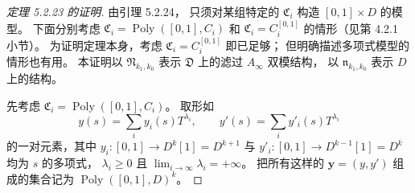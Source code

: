 \begin{proof}[定理 5.2.23 的证明]
由引理 5.2.24，
只须对某组特定的 $\mathfrak C_i$
构造 $[0,1]\times D$ 的模型。
下面分别考虑
$\mathfrak C_i=\operatorname{Poly}([0,1],C_i)$
和 $\mathfrak C_i=C_i^{[0,1]}$
的情形（见第 4.2.1 小节）。
为证明定理本身，考虑
$\mathfrak C_i=C_i^{[0,1]}$ 即已足够；
但明确描述多项式模型的情形也有用。
本证明以 $\mathfrak N_{k_1,k_0}$
表示 $\mathfrak D$ 上的滤过
$A_\infty$ 双模结构，
以 $\mathfrak n_{k_1,k_0}$
表示 $D$ 上的结构。

先考虑
$\mathfrak C_i=\operatorname{Poly}([0,1],C_i)$。
取形如
\[
y(s)=\sum_i y_i(s)T^{\lambda_i},
\qquad
y'(s)=\sum_i y'_i(s)T^{\lambda_i}
\]
的一对元素，其中 $y_i:[0,1]\to D^k[1]=D^{k+1}$
与 $y'_i:[0,1]\to D^{k-1}[1]=D^k$
均为 $s$ 的多项式，
$\lambda_i\geq0$ 且
$\lim_{i\to\infty}\lambda_i=+\infty$。
把所有这样的
$\mathbf y=(y,y')$ 组成的集合记为
$\operatorname{Poly}([0,1],D)^k$。


\end{proof}
